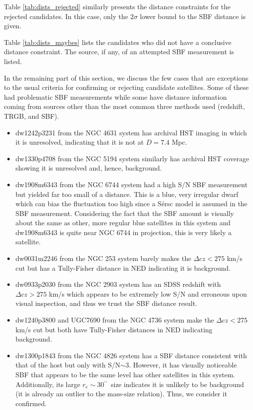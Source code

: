 \documentclass[twocolumn]{aastex62}
\newcommand{\arcs}{$^{\prime\prime}$} %
\begin{document}
Table \ref{tab:dists_rejected} similarly presents the distance constraints for the rejected candidates. In this case, only the $2\sigma$ lower bound to the SBF distance is given. 

Table \ref{tab:dists_maybes} lists the candidates who did not have a conclusive distance constraint. The source, if any, of an attempted SBF measurement is listed. 


In the remaining part of this section, we discuss the few cases that are exceptions to the usual criteria for confirming or rejecting candidate satellites. Some of these had problematic SBF measurements while some have distance information coming from sources other than the most common three methods used (redshift, TRGB, and SBF). 

\begin{itemize}
    \item dw1242p3231 from the NGC 4631 system has archival HST imaging in which it is unresolved, indicating that it is not at $D=7.4$ Mpc.
    \item dw1330p4708 from the NGC 5194 system similarly has archival HST coverage showing it is unresolved and, hence, background.
    \item dw1908m6343 from the NGC 6744 system had a high S/N SBF measurement but yielded far too small of a distance. This is a blue, very irregular dwarf which can bias the fluctuation too high since a S\'{e}rsc model is assumed in the SBF measurement. Considering the fact that the SBF amount is visually about the same as other, more regular blue satellites in this system and dw1908m6343 is quite near NGC 6744 in projection, this is very likely a satellite. 
    \item dw0031m2246 from the NGC 253 system barely makes the $\Delta cz <275$ km/s cut but has a Tully-Fisher distance in NED indicating it is background.
    \item dw0933p2030 from the NGC 2903 system has an SDSS redshift with $\Delta cz >275$ km/s which appears to be extremely low S/N and erroneous upon visual inspection, and thus we trust the SBF distance result.
    \item dw1240p3800 and UGC7690 from the NGC 4736 system make the $\Delta cz <275$ km/s cut but both have Tully-Fisher distances in NED indicating background.
    \item dw1300p1843 from the NGC 4826 system has a SBF distance consistent with that of the host but only with S/N$\sim3$. However, it has visually noticeable SBF that appears to be the same level has other satellites in this system. Additionally, its large $r_e\sim30$\arcs~size indicates it is unlikely to be background (it is already an outlier to the mass-size relation). Thus, we consider it confirmed.

\end{itemize}
\end{document}
